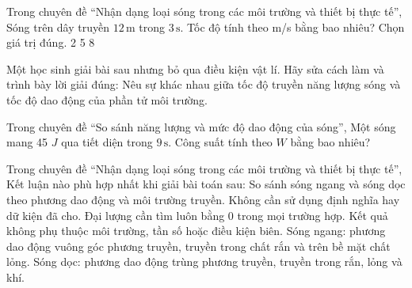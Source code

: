 \begin{ex}
Trong chuyên đề “Nhận dạng loại sóng trong các môi trường và thiết bị thực tế”, Sóng trên dây truyền $12\,\text{m}$ trong $3\,\text{s}$. Tốc độ tính theo m/s bằng bao nhiêu? Chọn giá trị đúng.
\choice
{2}
{5}
{}
{8}
\end{ex}

\begin{ex}
Một học sinh giải bài sau nhưng bỏ qua điều kiện vật lí. Hãy sửa cách làm và trình bày lời giải đúng: Nêu sự khác nhau giữa tốc độ truyền năng lượng sóng và tốc độ dao động của phần tử môi trường.
\choiceTF

\end{ex}

\begin{ex}
Trong chuyên đề “So sánh năng lượng và mức độ dao động của sóng”, Một sóng mang 45 $J$ qua tiết diện trong $9\,\text{s}$. Công suất tính theo $W$ bằng bao nhiêu?
\end{ex}

\begin{ex}
Trong chuyên đề “Nhận dạng loại sóng trong các môi trường và thiết bị thực tế”, Kết luận nào phù hợp nhất khi giải bài toán sau: So sánh sóng ngang và sóng dọc theo phương dao động và môi trường truyền.
\choice
{Không cần sử dụng định nghĩa hay dữ kiện đã cho.}
{Đại lượng cần tìm luôn bằng 0 trong mọi trường hợp.}
{Kết quả không phụ thuộc môi trường, tần số hoặc điều kiện biên.}
{\True Sóng ngang: phương dao động vuông góc phương truyền, truyền trong chất rắn và trên bề mặt chất lỏng. Sóng dọc: phương dao động trùng phương truyền, truyền trong rắn, lỏng và khí.}
\end{ex}

